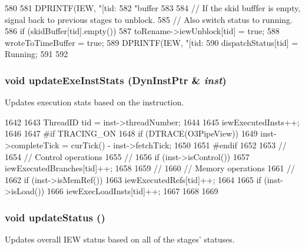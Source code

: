 \begin{DoxyCode}
580 {
581     DPRINTF(IEW, "[tid:%
582             "buffer %
583 
584     // If the skid bufffer is empty, signal back to previous stages to unblock.
585     // Also switch status to running.
586     if (skidBuffer[tid].empty()) {
587         toRename->iewUnblock[tid] = true;
588         wroteToTimeBuffer = true;
589         DPRINTF(IEW, "[tid:%
590         dispatchStatus[tid] = Running;
591     }
592 }
\end{DoxyCode}
\hypertarget{classDefaultIEW_a132db67a5c42af856da64e347e8284d8}{
\subsubsection[{updateExeInstStats}]{\setlength{\rightskip}{0pt plus 5cm}void updateExeInstStats ({\bf DynInstPtr} \& {\em inst})}}
\label{classDefaultIEW_a132db67a5c42af856da64e347e8284d8}
Updates execution stats based on the instruction. 


\begin{DoxyCode}
1642 {
1643     ThreadID tid = inst->threadNumber;
1644 
1645     iewExecutedInsts++;
1646 
1647 #if TRACING_ON
1648     if (DTRACE(O3PipeView)) {
1649         inst->completeTick = curTick() - inst->fetchTick;
1650     }
1651 #endif
1652 
1653     //
1654     //  Control operations
1655     //
1656     if (inst->isControl())
1657         iewExecutedBranches[tid]++;
1658 
1659     //
1660     //  Memory operations
1661     //
1662     if (inst->isMemRef()) {
1663         iewExecutedRefs[tid]++;
1664 
1665         if (inst->isLoad()) {
1666             iewExecLoadInsts[tid]++;
1667         }
1668     }
1669 }
\end{DoxyCode}
\hypertarget{classDefaultIEW_a4bb9486757ce225941aaaf759b357a57}{
\subsubsection[{updateStatus}]{\setlength{\rightskip}{0pt plus 5cm}void updateStatus ()}}
\label{classDefaultIEW_a4bb9486757ce225941aaaf759b357a57}
Updates overall IEW status based on all of the stages' statuses. 


